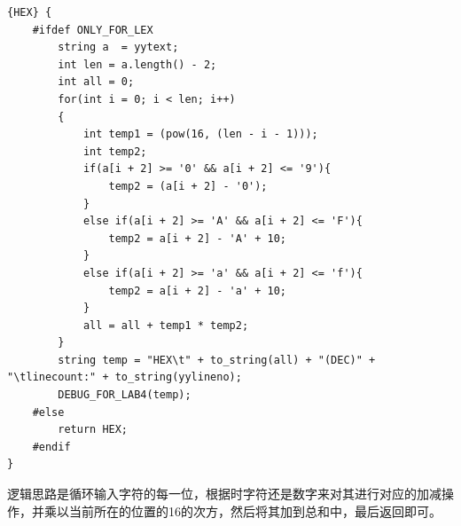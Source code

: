\documentclass[UTF8,a4paper,10pt]{ctexart}
\begin{document}
\begin{lstlisting}[title = 16进制转换]
{HEX} {
    #ifdef ONLY_FOR_LEX
        string a  = yytext;
        int len = a.length() - 2;
        int all = 0;
        for(int i = 0; i < len; i++)
        {
            int temp1 = (pow(16, (len - i - 1)));
            int temp2;
            if(a[i + 2] >= '0' && a[i + 2] <= '9'){
                temp2 = (a[i + 2] - '0');
            }
            else if(a[i + 2] >= 'A' && a[i + 2] <= 'F'){
                temp2 = a[i + 2] - 'A' + 10;
            }
            else if(a[i + 2] >= 'a' && a[i + 2] <= 'f'){
                temp2 = a[i + 2] - 'a' + 10;
            }
            all = all + temp1 * temp2;         
        }
        string temp = "HEX\t" + to_string(all) + "(DEC)" + "\tlinecount:" + to_string(yylineno);
        DEBUG_FOR_LAB4(temp);
    #else 
        return HEX;
    #endif
}
\end{lstlisting}
逻辑思路是循环输入字符的每一位，根据时字符还是数字来对其进行对应的加减操作，并乘以当前所在的位置的16的次方，然后将其加到总和中，最后返回即可。
\end{document}

